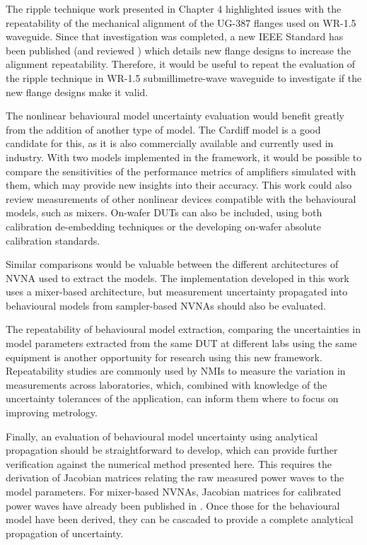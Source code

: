 \documentclass[../thesis/thesis.tex]{subfiles}
\begin{document}
\begin{refsection}
The ripple technique work presented in Chapter 4 highlighted issues with the repeatability of the mechanical alignment of the UG-387 flanges used on WR-1.5 waveguide. Since that investigation was completed, a new IEEE Standard has been published (and reviewed \cite{Ridler_2017}) which details new flange designs to increase the alignment repeatability. Therefore, it would be useful to repeat the evaluation of the ripple technique in WR-1.5 submillimetre-wave waveguide to investigate if the new flange designs make it valid.

The nonlinear behavioural model uncertainty evaluation would benefit greatly from the addition of another type of model. The Cardiff model is a good candidate for this, as it is also commercially available and currently used in industry. With two models implemented in the framework, it would be possible to compare the sensitivities of the performance metrics of amplifiers simulated with them, which may provide new insights into their accuracy. This work could also review measurements of other nonlinear devices compatible with the behavioural models, such as mixers. On-wafer DUTs can also be included, using both calibration de-embedding techniques or the developing on-wafer absolute calibration standards.

Similar comparisons would be valuable between the different architectures of NVNA used to extract the models. The implementation developed in this work uses a mixer-based architecture, but measurement uncertainty propagated into behavioural models from sampler-based NVNAs should also be evaluated.

The repeatability of behavioural model extraction, comparing the uncertainties in model parameters extracted from the same DUT at different labs using the same equipment is another opportunity for research using this new framework. Repeatability studies are commonly used by NMIs to measure the variation in measurements across laboratories, which, combined with knowledge of the uncertainty tolerances of the application, can inform them where to focus on improving metrology.

Finally, an evaluation of behavioural model uncertainty using analytical propagation should be straightforward to develop, which can provide further verification against the numerical method presented here. This requires the derivation of Jacobian matrices relating the raw measured power waves to the model parameters. For mixer-based NVNAs, Jacobian matrices for calibrated power waves have already been published in \cite{Lin_2012}. Once those for the behavioural model have been derived, they can be cascaded to provide a complete analytical propagation of uncertainty.

\printbibliography[title=References]
\end{refsection}
\end{document}
